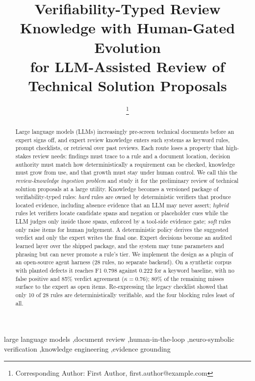 \documentclass{IOS-Book-Article}
\def\hb{\hbox to 11.5 cm{}}
\begin{document}
\pagestyle{headings}
\def\thepage{}

\begin{frontmatter}

\title{Verifiability-Typed Review Knowledge with Human-Gated Evolution\\ for LLM-Assisted Review of Technical Solution Proposals}

\markboth{}{October 2026\hb}

\author[A]{ %
\thanks{Corresponding Author: First Author, first.author@example.com}}
\address[A]{Organisation, City, Country}

\begin{abstract}
Large language models (LLMs) increasingly pre-screen technical documents before an expert signs off, and expert review knowledge enters such systems as keyword rules, prompt checklists, or retrieval over past reviews. Each route loses a property that high-stakes review needs: findings must trace to a rule and a document location, decision authority must match how deterministically a requirement can be checked, knowledge must grow from use, and that growth must stay under human control. We call this the \emph{review-knowledge ingestion problem} and study it for the preliminary review of technical solution proposals at a large utility. Knowledge becomes a versioned package of verifiability-typed rules: \emph{hard} rules are owned by deterministic verifiers that produce located evidence, including absence evidence that an LLM may never assert; \emph{hybrid} rules let verifiers locate candidate spans and negation or placeholder cues while the LLM judges only inside those spans, enforced by a tool-side evidence gate; \emph{soft} rules only raise items for human judgement. A deterministic policy derives the suggested verdict and only the expert writes the final one. Expert decisions become an audited learned layer over the shipped package, and the system may tune parameters and phrasing but can never promote a rule's tier. We implement the design as a plugin of an open-source agent harness (28 rules, no separate backend). On a synthetic corpus with planted defects it reaches F1 0.798 against 0.222 for a keyword baseline, with no false positive and 85\% verdict agreement ($\kappa=0.76$); 80\% of the remaining misses surface to the expert as open items. Re-expressing the legacy checklist showed that only 10 of 28 rules are deterministically verifiable, and the four blocking rules least of all.
\end{abstract}

\begin{keyword}
large language models \sep document review \sep human-in-the-loop \sep neuro-symbolic verification \sep knowledge engineering \sep evidence grounding
\end{keyword}

\end{frontmatter}
\end{document}
